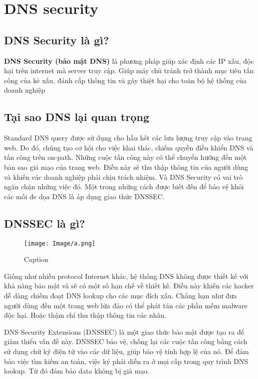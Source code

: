 \documentclass{article}
\begin{document}
\section{DNS security}
\subsection{DNS Security là gì?}
\textbf{DNS Security (bảo mật DNS)}
là phương pháp giúp xác định các IP xấu, độc hại trên internet mà server truy cập. Giúp máy chủ tránh trở thành mục tiêu tấn công của kẻ xấu, đánh cắp thông tin và gây thiệt hại cho toàn bộ hệ thống của doanh nghiệp

\subsection{Tại sao DNS lại quan trọng}
Standard DNS query được sử dụng cho hầu hết các lưu lượng truy cập vào trang web. Do đó, chúng tạo cơ hội cho việc khai thác, chiếm quyền điều khiển DNS và tấn công trên on-path. Những cuộc tấn công này có thể chuyển hướng đến một bản sao giả mạo của trang web. Điều này sẽ thu thập thông tin của người dùng và khiến các doanh nghiệp phải chịu trách nhiệm. Và DNS Security có vai trò ngăn chặn những việc đó. Một trong những cách được biết đến để bảo vệ khỏi các mối đe dọa DNS là áp dụng giao thức DNSSEC.

\subsection{DNSSEC là gì?}

\begin{figure}[!htp]
    \centering
    \texttt{[image: Image/a.png]}
    \caption{Caption}
    \label{fig:my_label}
\end{figure}
Giống như nhiều protocol Internet khác, hệ thống DNS không được thiết kế với khả năng bảo mật và sẽ có một số hạn chế về thiết kế. Điều này khiến các hacker dễ dàng chiếm đoạt DNS lookup cho các mục đích xấu. Chẳng hạn như đưa người dùng đến một trang web lừa đảo có thể phát tán các phần mềm malware độc hại. Hoặc thậm chí thu thập thông tin các nhân.

DNS Security Extensions (DNSSEC) là một giao thức bảo mật được tạo ra để giảm thiểu vấn đề này. DNSSEC bảo vệ, chống lại các cuộc tấn công bằng cách sử dụng chữ ký điện tử vào các dữ liệu, giúp bảo vệ tính hợp lệ của nó. Để đảm bảo việc tìm kiếm an toàn, việc ký phải diễn ra ở mọi cấp trong quy trình DNS lookup. Từ đó đảm bảo data không bị giả mạo.
\end{document}
